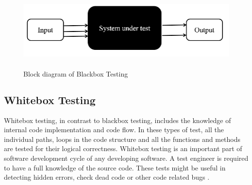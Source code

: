\documentclass[10pt]{ruthesis}
\begin{document}
\begin{figure}
  \centering
  \includegraphics[width=15cm,height=4cm]{bb.png}
  \caption{Block diagram of Blackbox Testing}
  \label{fig:bb}
\end{figure}


\subsection{Whitebox Testing}
Whitebox testing, in contrast to blackbox testing, includes the knowledge of internal code implementation and code flow. In these types of test, all the individual paths, loops in the code structure and all the functions and methods are tested for their logical correctness. Whitebox testing is an important part of software development cycle of any developing software. A test engineer is required to have a full knowledge of the source code. These tests might be useful in detecting hidden errors, check dead code or other code related bugs \cite{ref25}.
\end{document}

